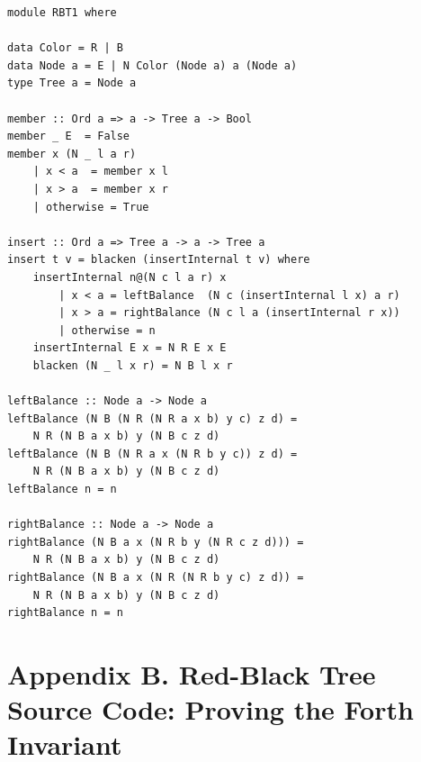 \documentclass{tmr}
\begin{document}
\begin{Verbatim}
module RBT1 where

data Color = R | B
data Node a = E | N Color (Node a) a (Node a) 
type Tree a = Node a

member :: Ord a => a -> Tree a -> Bool
member _ E  = False
member x (N _ l a r)
    | x < a  = member x l
    | x > a  = member x r
    | otherwise = True

insert :: Ord a => Tree a -> a -> Tree a
insert t v = blacken (insertInternal t v) where
    insertInternal n@(N c l a r) x
        | x < a = leftBalance  (N c (insertInternal l x) a r)
        | x > a = rightBalance (N c l a (insertInternal r x))
        | otherwise = n
    insertInternal E x = N R E x E
    blacken (N _ l x r) = N B l x r

leftBalance :: Node a -> Node a
leftBalance (N B (N R (N R a x b) y c) z d) =
    N R (N B a x b) y (N B c z d)
leftBalance (N B (N R a x (N R b y c)) z d) =
    N R (N B a x b) y (N B c z d)
leftBalance n = n

rightBalance :: Node a -> Node a
rightBalance (N B a x (N R b y (N R c z d))) =
    N R (N B a x b) y (N B c z d)
rightBalance (N B a x (N R (N R b y c) z d)) =
    N R (N B a x b) y (N B c z d)
rightBalance n = n
\end{Verbatim}

\section*{Appendix B. Red-Black Tree Source Code: Proving the Forth Invariant}
\label{sec:appendix_b}
\end{document}
